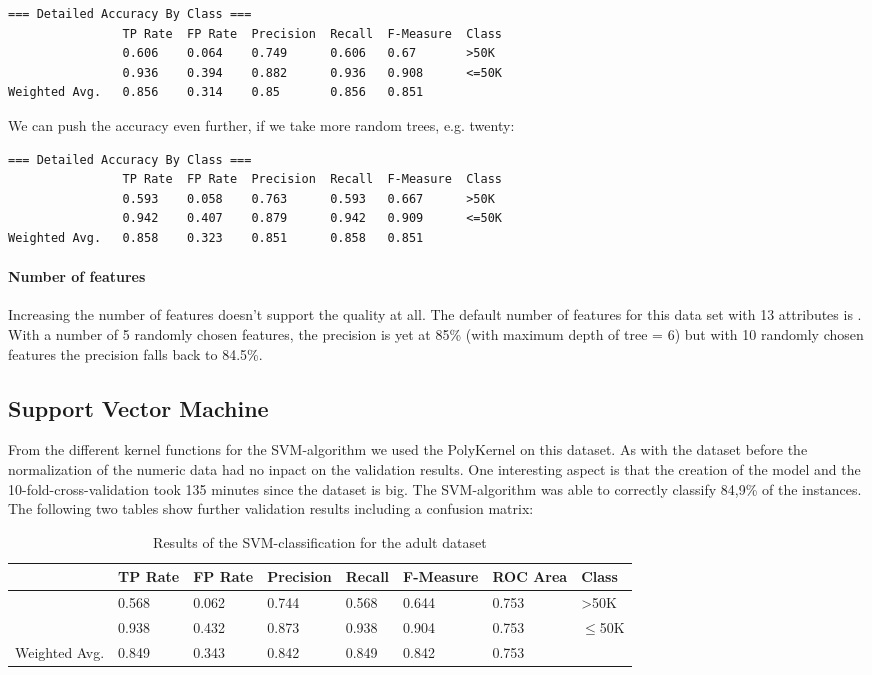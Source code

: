 \documentclass[paper=a4, fontsize=11pt]{scrartcl} %
\numberwithin{equation}{section} %
\numberwithin{figure}{section} %
\numberwithin{table}{section} %
\begin{document}
\begin{lstlisting}
=== Detailed Accuracy By Class ===
                TP Rate  FP Rate  Precision  Recall  F-Measure  Class
                0.606    0.064    0.749      0.606   0.67       >50K
                0.936    0.394    0.882      0.936   0.908      <=50K
Weighted Avg.   0.856    0.314    0.85       0.856   0.851     
\end{lstlisting}
We can push the accuracy even further, if we take more random trees, e.g. twenty:
\begin{lstlisting}
=== Detailed Accuracy By Class ===
                TP Rate  FP Rate  Precision  Recall  F-Measure  Class
                0.593    0.058    0.763      0.593   0.667      >50K
                0.942    0.407    0.879      0.942   0.909      <=50K
Weighted Avg.   0.858    0.323    0.851      0.858   0.851      
\end{lstlisting}

\paragraph{Number of features}
Increasing the number of features doesn't support the quality at all. The default number of features for this data set with 13 attributes is . With a number of 5 randomly chosen features, the precision is yet at 85\% (with maximum depth of tree = 6) but with 10 randomly chosen features the precision falls back to 84.5\%.

\subsection{Support Vector Machine}

From the different kernel functions for the SVM-algorithm we used the PolyKernel on this dataset. As with the dataset before the normalization of the numeric data had no inpact on the validation results. One interesting aspect is that the creation of the model and the 10-fold-cross-validation took 135 minutes since the dataset is big. The SVM-algorithm was able to correctly classify 84,9\% of the instances. The following two tables show further validation results including a confusion matrix:

\begin{table}[h]
\centering
\begin{tabular}{|llllllll|}
	\hline
									&TP Rate   	&FP Rate   &Precision   &Recall  &F-Measure &ROC Area  	&Class\\
	\hline
									&0.568     	&0.062     &0.744     	&0.568   &0.644    	&0.753    	&	>50K\\
  								&0.938     	&0.432     &0.873     	&0.938   &0.904     &0.753    	&$\leq$50K\\
  \hline
	Weighted Avg.   & 0.849    & 0.343     &0.842   		&0.849   &0.842     & 0.753			&\\
	\hline
\end{tabular}
\caption{Results of the SVM-classification for the adult dataset}
\end{table}
\end{document}
